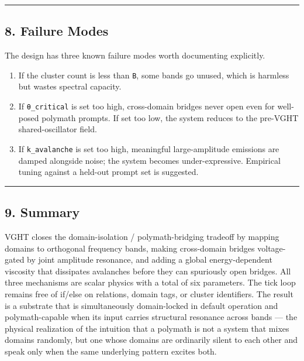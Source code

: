 \documentclass[
  11pt,
  a4paper,
]{article}
\providecommand{\tightlist}{%
  \setlength{\itemsep}{0pt}\setlength{\parskip}{0pt}}
\begin{document}
\begin{center}\rule{0.5\linewidth}{0.5pt}\end{center}

\subsection{8. Failure Modes}\label{failure-modes}

The design has three known failure modes worth documenting explicitly.

\begin{enumerate}
\def\labelenumi{\arabic{enumi}.}
\tightlist
\item
  If the cluster count is less than \texttt{B}, some bands go unused,
  which is harmless but wastes spectral capacity.
\item
  If \texttt{θ\_critical} is set too high, cross-domain bridges never
  open even for well-posed polymath prompts. If set too low, the system
  reduces to the pre-VGHT shared-oscillator field.
\item
  If \texttt{k\_avalanche} is set too high, meaningful large-amplitude
  emissions are damped alongside noise; the system becomes
  under-expressive. Empirical tuning against a held-out prompt set is
  suggested.
\end{enumerate}

\begin{center}\rule{0.5\linewidth}{0.5pt}\end{center}

\subsection{9. Summary}\label{summary}

VGHT closes the domain-isolation / polymath-bridging tradeoff by mapping
domains to orthogonal frequency bands, making cross-domain bridges
voltage-gated by joint amplitude resonance, and adding a global
energy-dependent viscosity that dissipates avalanches before they can
spuriously open bridges. All three mechanisms are scalar physics with a
total of six parameters. The tick loop remains free of if/else on
relations, domain tags, or cluster identifiers. The result is a
substrate that is simultaneously domain-locked in default operation and
polymath-capable when its input carries structural resonance across
bands --- the physical realization of the intuition that a polymath is
not a system that mixes domains randomly, but one whose domains are
ordinarily silent to each other and speak only when the same underlying
pattern excites both.
\end{document}
